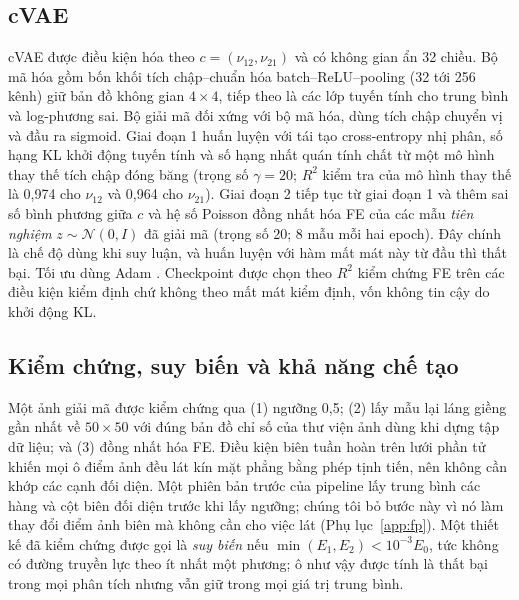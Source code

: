 \documentclass[a4paper,11pt]{article}
\newcommand{\nuot}{\nu_{12}}
\newcommand{\nuto}{\nu_{21}}
\newcommand{\RR}{R^2}
\begin{document}
\subsection{cVAE}
cVAE \citep{kingma2014vae,sohn2015cvae} được điều kiện hóa theo
$c=(\nuot,\nuto)$ và có không gian ẩn 32 chiều. Bộ mã hóa gồm bốn khối
tích chập--chuẩn hóa batch--ReLU--pooling (32 tới 256 kênh) giữ bản đồ không
gian $4\times4$, tiếp theo là các lớp tuyến tính cho trung bình và
log-phương sai. Bộ giải mã đối xứng với bộ mã hóa, dùng tích chập chuyển vị
và đầu ra sigmoid. Giai đoạn 1 huấn luyện với tái tạo cross-entropy nhị
phân, số hạng KL khởi động tuyến tính \citep{bowman2016generating} và số hạng
nhất quán tính chất từ một mô hình thay thế tích chập đóng băng (trọng số
$\gamma=20$; $\RR$ kiểm tra của mô hình thay thế là 0,974 cho $\nuot$ và
0,964 cho $\nuto$). Giai đoạn 2 tiếp tục từ giai đoạn 1 và thêm sai số bình
phương giữa $c$ và hệ số Poisson đồng nhất hóa FE của các mẫu \emph{tiên
nghiệm} $z\sim\mathcal N(0,I)$ đã giải mã (trọng số 20; 8 mẫu mỗi hai
epoch). Đây chính là chế độ dùng khi suy luận, và huấn luyện với hàm mất mát
này từ đầu thì thất bại. Tối ưu dùng Adam \citep{kingma2015adam}. Checkpoint
được chọn theo $\RR$ kiểm chứng FE trên các điều kiện kiểm định chứ không
theo mất mát kiểm định, vốn không tin cậy do khởi động KL.

\subsection{Kiểm chứng, suy biến và khả năng chế tạo}
\label{sec:verify}
Một ảnh giải mã được kiểm chứng qua (1) ngưỡng 0,5; (2) lấy mẫu lại láng
giềng gần nhất về $50\times50$ với đúng bản đồ chỉ số của thư viện ảnh dùng
khi dựng tập dữ liệu; và (3) đồng nhất hóa FE. Điều kiện biên tuần hoàn trên
lưới phần tử khiến mọi ô điểm ảnh đều lát kín mặt phẳng bằng phép tịnh tiến,
nên không cần khớp các cạnh đối diện. Một phiên bản trước của pipeline lấy
trung bình các hàng và cột biên đối diện trước khi lấy ngưỡng; chúng tôi bỏ
bước này vì nó làm thay đổi điểm ảnh biên mà không cần cho việc lát
(Phụ lục~\ref{app:fp}). Một thiết kế đã kiểm chứng được gọi là \emph{suy
biến} nếu $\min(E_1,E_2)<10^{-3}E_0$, tức không có đường truyền lực theo ít
nhất một phương; ô như vậy được tính là thất bại trong mọi phân tích nhưng
vẫn giữ trong mọi giá trị trung bình.
\end{document}
